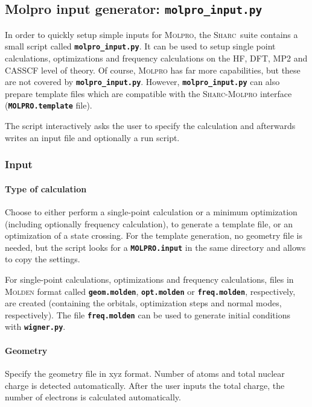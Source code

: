 \documentclass[a4paper,10pt,DIV=15,openany]{scrbook}
\newcommand{\sharc}{\textsc{Sharc}}
\newcommand{\ttt}[1]{\textbf{\texttt{#1}}}
\begin{document}
\subsection{Molpro input generator: \ttt{molpro\_input.py}}\label{sec:molpro_input.py}

In order to quickly setup simple inputs for \textsc{Molpro}, the \sharc\ suite contains a small script called \ttt{molpro\_input.py}. It can be used to setup single point calculations, optimizations and frequency calculations on the HF, DFT, MP2 and CASSCF level of theory. Of course, \textsc{Molpro} has far more capabilities, but these are not covered by \ttt{molpro\_input.py}. However, \ttt{molpro\_input.py} can also prepare template files which are compatible with the \sharc-\textsc{Molpro} interface (\ttt{MOLPRO.template} file).

The script interactively asks the user to specify the calculation and afterwards writes an input file and optionally a run script.

\subsubsection{Input}

\paragraph{Type of calculation}

Choose to either perform a single-point calculation or a minimum optimization (including optionally frequency calculation), to generate a template file, or an optimization of a state crossing. For the template generation, no geometry file is needed, but the script looks for a \ttt{MOLPRO.input} in the same directory and allows to copy the settings. 

For single-point calculations, optimizations and frequency calculations, files in \textsc{Molden} format called \ttt{geom.molden}, \ttt{opt.molden} or \ttt{freq.molden}, respectively, are created (containing the orbitals, optimization steps and normal modes, respectively). The file \ttt{freq.molden} can be used to generate initial conditions with \ttt{wigner.py}.

\paragraph{Geometry}

Specify the geometry file in xyz format. Number of atoms and total nuclear charge is detected automatically. After the user inputs the total charge, the number of electrons is calculated automatically.
\end{document}
